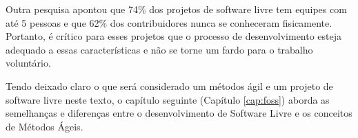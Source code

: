 Outra pesquisa \cite{Reis2003} apontou que 74\% dos projetos de
software livre tem equipes com até 5 pessoas e que 62\% dos
contribuidores nunca se conheceram fisicamente. Portanto, é crítico
para esses projetos que o processo de desenvolvimento esteja adequado
a essas características e não se torne um fardo para o trabalho
voluntário.

Tendo deixado claro o que será considerado um métodos ágil e um
projeto de software livre neste texto, o capítulo seguinte (Capítulo
\ref{cap:foss}) aborda as semelhanças e diferenças entre o
desenvolvimento de Software Livre e os conceitos de Métodos Ágeis.
